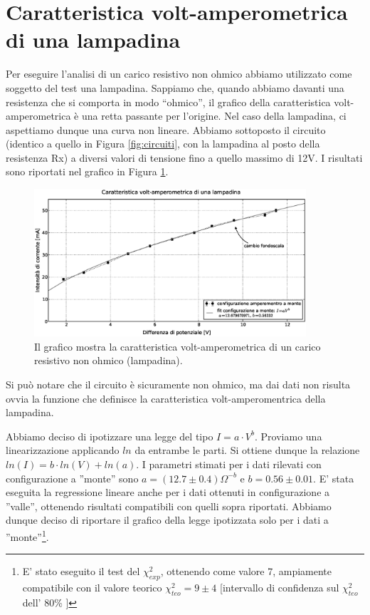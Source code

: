 \section{Caratteristica volt-amperometrica di una lampadina}
Per eseguire l'analisi di un carico resistivo non ohmico abbiamo utilizzato come soggetto del test una lampadina. Sappiamo che, quando abbiamo davanti una resistenza che si comporta in modo ``ohmico'', il grafico della caratteristica volt-amperometrica è una retta passante per l'origine. Nel caso della lampadina, ci aspettiamo dunque una curva non lineare. Abbiamo sottoposto il circuito (identico a quello in Figura \ref{fig:circuiti}, con la lampadina al posto della resistenza Rx) a diversi valori di tensione fino a quello massimo di 12V. I risultati sono riportati nel grafico in Figura \ref{fig:lampadina}.

\begin{figure}[h]
    \centering
        \includegraphics[width=0.9\textwidth]{lamp.eps}
        \caption{Il grafico mostra la caratteristica volt-amperometrica di un carico resistivo non ohmico (lampadina).}
        \label{fig:lampadina}
\end{figure}

Si può notare che il circuito è sicuramente non ohmico, ma dai dati non risulta ovvia la funzione che definisce la caratteristica volt-amperomentrica della lampadina.

Abbiamo deciso di ipotizzare una legge del tipo $I=a \cdot V^{b}$. Proviamo una linearizzazione applicando $ln$ da entrambe le parti. Si ottiene dunque la relazione $ln(I)=b \cdot ln(V) + ln(a)$.  I parametri stimati per i dati rilevati con configurazione a ''monte'' sono $a=(12.7\pm 0.4)\Omega^{-b}$ e $b=0.56 \pm 0.01$. E' stata eseguita la regressione lineare anche per i dati ottenuti in configurazione a ''valle'', ottenendo risultati compatibili con quelli sopra riportati. Abbiamo dunque deciso di riportare il grafico della legge ipotizzata solo per i dati a ''monte''\footnote{E' stato eseguito il test del $\chi ^2_{exp}$, ottenendo come valore 7, ampiamente compatibile con il valore teorico $\chi ^2_{teo}=9 \pm 4$ [intervallo di confidenza sul $\chi ^2_{teo}$ dell' 80\% ] }.

